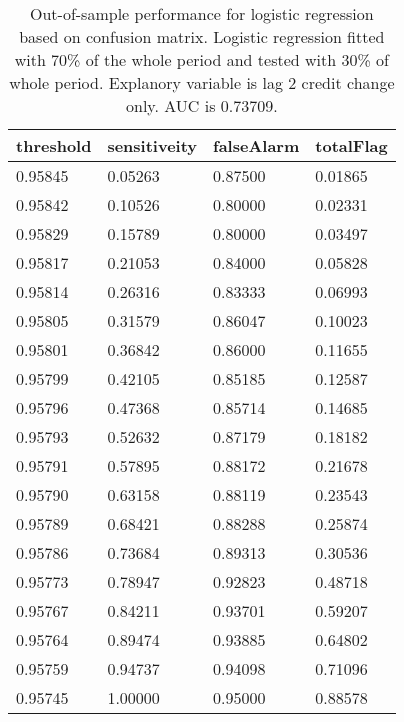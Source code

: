 \documentclass{article}
\begin{document}
\begin{table}[H]
    \parbox{.45\linewidth}{
        \begin{tabular}{|l|l|l|l|}
        \hline
         threshold         & sensitiveity        & falseAlarm         & totalFlag            \\ \hline
        0.95845 & 0.05263 & 0.87500              & 0.01865 \\ \hline
        0.95842 & 0.10526 & 0.80000                & 0.02331 \\ \hline
        0.95829 & 0.15789 & 0.80000                & 0.03497  \\ \hline
        0.95817 & 0.21053 & 0.84000               & 0.05828  \\ \hline
        0.95814 & 0.26316  & 0.83333 & 0.06993  \\ \hline
        0.95805 & 0.31579  & 0.86047 & 0.10023  \\ \hline
        0.95801 & 0.36842  & 0.86000               & 0.11655  \\ \hline
        0.95799 & 0.42105 & 0.85185 & 0.12587   \\ \hline
        0.95796 & 0.47368 & 0.85714 & 0.14685  \\ \hline
        0.95793 & 0.52632  & 0.87179 & 0.18182  \\ \hline
        0.95791 & 0.57895  & 0.88172 & 0.21678  \\ \hline
        0.95790 & 0.63158   & 0.88119 & 0.23543  \\ \hline
        0.95789 & 0.68421  & 0.88288 & 0.25874  \\ \hline
        0.95786 & 0.73684  & 0.89313 & 0.30536  \\ \hline
        0.95773 & 0.78947  & 0.92823 & 0.48718  \\ \hline
        0.95767 & 0.84211  & 0.93701  & 0.59207   \\ \hline
        0.95764   & 0.89474  & 0.93885 & 0.64802   \\ \hline
        0.95759 & 0.94737  & 0.94098  & 0.71096    \\ \hline
        0.95745 & 1.00000                 & 0.95000               & 0.88578   \\ \hline
        \end{tabular}
        \caption{Out-of-sample performance for logistic regression based on confusion matrix.
        Logistic regression fitted with 70\% of the whole period and
        tested with 30\% of whole period. Explanory variable is lag 2
        credit change only. AUC is 0.73709.}
}
\end{table}
\end{document}
